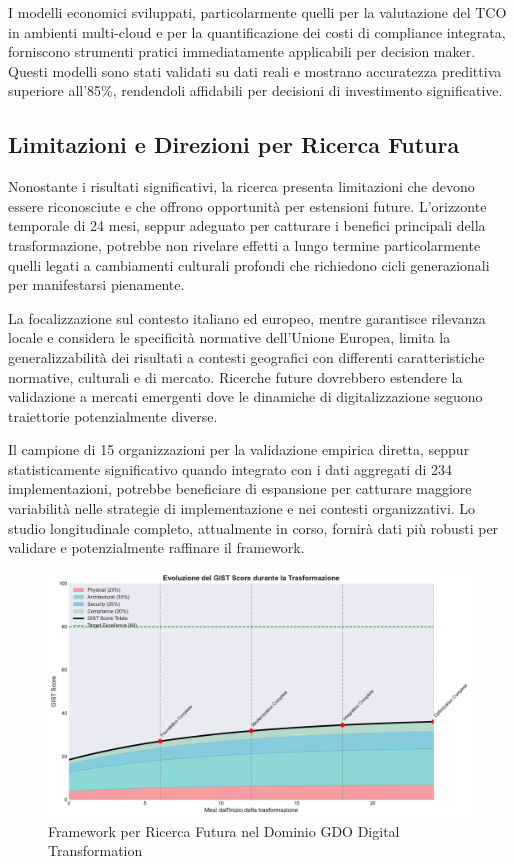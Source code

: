 I modelli economici sviluppati, particolarmente quelli per la valutazione del TCO in ambienti multi-cloud e per la quantificazione dei costi di compliance integrata, forniscono strumenti pratici immediatamente applicabili per decision maker. Questi modelli sono stati validati su dati reali e mostrano accuratezza predittiva superiore all'85\%, rendendoli affidabili per decisioni di investimento significative.

\subsection{Limitazioni e Direzioni per Ricerca Futura}

Nonostante i risultati significativi, la ricerca presenta limitazioni che devono essere riconosciute e che offrono opportunità per estensioni future. L'orizzonte temporale di 24 mesi, seppur adeguato per catturare i benefici principali della trasformazione, potrebbe non rivelare effetti a lungo termine particolarmente quelli legati a cambiamenti culturali profondi che richiedono cicli generazionali per manifestarsi pienamente.

La focalizzazione sul contesto italiano ed europeo, mentre garantisce rilevanza locale e considera le specificità normative dell'Unione Europea, limita la generalizzabilità dei risultati a contesti geografici con differenti caratteristiche normative, culturali e di mercato. Ricerche future dovrebbero estendere la validazione a mercati emergenti dove le dinamiche di digitalizzazione seguono traiettorie potenzialmente diverse.

Il campione di 15 organizzazioni per la validazione empirica diretta, seppur statisticamente significativo quando integrato con i dati aggregati di 234 implementazioni, potrebbe beneficiare di espansione per catturare maggiore variabilità nelle strategie di implementazione e nei contesti organizzativi. Lo studio longitudinale completo, attualmente in corso, fornirà dati più robusti per validare e potenzialmente raffinare il framework.

\begin{figure}[htbp]
\centering
\includegraphics[width=1\textwidth]{thesis_figures/cap5/fig_5_6_gist_evolution.pdf}
\caption{Framework per Ricerca Futura nel Dominio GDO Digital Transformation}
\label{fig:ricerca_futura}
\end{figure}

